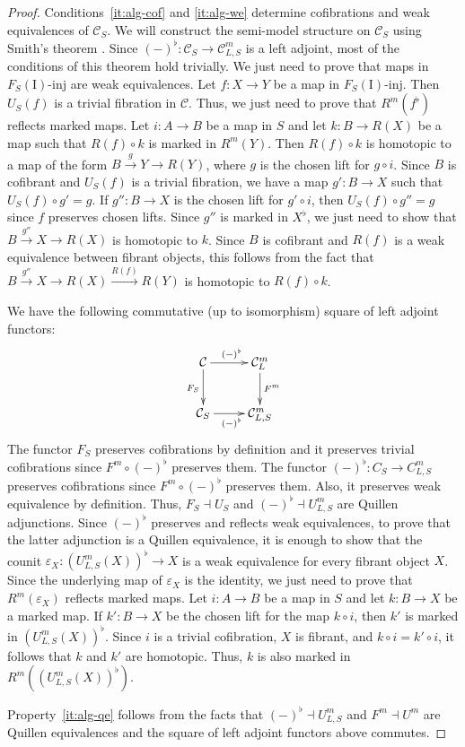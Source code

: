 \documentclass[reqno]{amsart}
\theoremstyle{definition}
\theoremstyle{remark}
\newcommand{\fs}[1]{\mathrm{#1}}
\newcommand{\cat}[1]{\mathcal{#1}}
\newcommand{\C}{\cat{C}}
\newcommand{\I}{\fs{I}}
\newcommand{\class}[2]{#1\text{-}\mathrm{#2}}
\newcommand{\Iinj}[1][\I]{\class{#1}{inj}}
\numberwithin{figure}{section}
\begin{document}
\begin{proof}
Conditions~\eqref{it:alg-cof} and \eqref{it:alg-we} determine cofibrations and weak equivalences of $\C_S$.
We will construct the semi-model structure on $\C_S$ using Smith's theorem \cite[Theorem~3.1]{semi-smith}.
Since $(-)^\flat : \C_S \to \C^m_{L,S}$ is a left adjoint, most of the conditions of this theorem hold trivially.
We just need to prove that maps in $\Iinj[F_S(\I)]$ are weak equivalences.
Let $f : X \to Y$ be a map in $\Iinj[F_S(\I)]$.
Then $U_S(f)$ is a trivial fibration in $\C$.
Thus, we just need to prove that $R^m(f^\flat)$ reflects marked maps.
Let $i : A \to B$ be a map in $S$ and let $k : B \to R(X)$ be a map such that $R(f) \circ k$ is marked in $R^m(Y)$.
Then $R(f) \circ k$ is homotopic to a map of the form $B \xrightarrow{g} Y \to R(Y)$, where $g$ is the chosen lift for $g \circ i$.
Since $B$ is cofibrant and $U_S(f)$ is a trivial fibration, we have a map $g' : B \to X$ such that $U_S(f) \circ g' = g$.
If $g'' : B \to X$ is the chosen lift for $g' \circ i$, then $U_S(f) \circ g'' = g$ since $f$ preserves chosen lifts.
Since $g''$ is marked in $X^\flat$, we just need to show that $B \xrightarrow{g''} X \to R(X)$ is homotopic to $k$.
Since $B$ is cofibrant and $R(f)$ is a weak equivalence between fibrant objects, this follows from the fact that $B \xrightarrow{g''} X \to R(X) \xrightarrow{R(f)} R(Y)$ is homotopic to $R(f) \circ k$.

We have the following commutative (up to isomorphism) square of left adjoint functors:
\[ \xymatrix{ \C \ar[r]^{(-)^\flat} \ar[d]_{F_S} & \C^m_L \ar[d]^{F^m} \\
              \C_S \ar[r]_{(-)^\flat}            & \C^m_{L,S}
            } \]
The functor $F_S$ preserves cofibrations by definition and it preserves trivial cofibrations since $F^m \circ (-)^\flat$ preserves them.
The functor $(-)^\flat : C_S \to C^m_{L,S}$ preserves cofibrations since $F^m \circ (-)^\flat$ preserves them.
Also, it preserves weak equivalence by definition.
Thus, $F_S \dashv U_S$ and $(-)^\flat \dashv U^m_{L,S}$ are Quillen adjunctions.
Since $(-)^\flat$ preserves and reflects weak equivalences, to prove that the latter adjunction is a Quillen equivalence, it is enough to show that the counit $\varepsilon_X : (U^m_{L,S}(X))^\flat \to X$ is a weak equivalence for every fibrant object $X$.
Since the underlying map of $\varepsilon_X$ is the identity, we just need to prove that $R^m(\varepsilon_X)$ reflects marked maps.
Let $i : A \to B$ be a map in $S$ and let $k : B \to X$ be a marked map.
If $k' : B \to X$ be the chosen lift for the map $k \circ i$, then $k'$ is marked in $(U^m_{L,S}(X))^\flat$.
Since $i$ is a trivial cofibration, $X$ is fibrant, and $k \circ i = k' \circ i$, it follows that $k$ and $k'$ are homotopic.
Thus, $k$ is also marked in $R^m((U^m_{L,S}(X))^\flat)$.

Property~\eqref{it:alg-qe} follows from the facts that $(-)^\flat \dashv U^m_{L,S}$ and $F^m \dashv U^m$ are Quillen equivalences and the square of left adjoint functors above commutes.
\end{proof}
\end{document}
